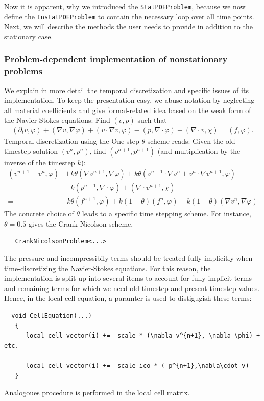 \documentclass[prodmode,acmtoms]{acmsmall}
\numberwithin{equation}{section}
\renewcommand{\phi}{\varphi}
\begin{document}
Now it is apparent, why we introduced the \texttt{StatPDEProblem}, because
we now define the \texttt{InstatPDEProblem} to contain the necessary 
loop over all time points. Next, we will describe the methods the user needs to 
provide in addition to the stationary case.

\subsubsection{Problem-dependent 
implementation of nonstationary problems}
\label{sec:timedep:implementation}
We explain in more detail the temporal discretization
and specific issues of its implementation. 
To keep the presentation easy, we abuse notation 
by neglecting
all material coefficients
and give formal-related idea based on the weak 
form of the Navier-Stokes equations:
Find $(v,p)$ such that
\begin{align*}
(\partial_t v,\phi) 
+ (\nabla v, \nabla \phi)
+ (v\cdot\nabla v,\phi)
-(p,\nabla\cdot \phi)
+(\nabla\cdot v, \chi)
=(f,\phi).
\end{align*}
Temporal discretization using the One-step-$\theta$ scheme reads:
Given the old timestep solution $(v^n,p^n)$, 
find $(v^{n+1}, p^{n+1})$ (and multiplication 
by the inverse of the timestep $k$):
\begin{align*}
(v^{n+1} - v^{n}, \phi)
&+ k\theta (\nabla v^{n+1}, \nabla \phi)
+ k\theta (v^{n+1}\cdot\nabla v^n + 
  v^{n}\cdot\nabla v^{n+1},\phi)\\
&- k (p^{n+1},\nabla\cdot \phi)
+ (\nabla\cdot v^{n+1}, \chi)\\
=&\; k\theta (f^{n+1},\phi) + k(1-\theta) (f^{n},\phi)
- k(1-\theta) (\nabla v^{n}, \nabla \phi) 
\end{align*}
The concrete choice of $\theta$ leads to a
specific time stepping scheme. For instance,
$\theta = 0.5$ gives the Crank-Nicolson scheme,
\begin{lstlisting}
   CrankNicolsonProblem<...>
\end{lstlisting}


The pressure and incompressibily terms should be 
treated fully implicitly when time-discretizing 
the Navier-Stokes equations.
For this reason, the implementation is split up
into several items to account for fully implicit 
terms and remaining terms for which we need 
old timestep and present timestep values. 
Hence, in the local cell equation, a paramter
is used to distigugish these terms:
\begin{lstlisting}
  void CellEquation(...)
   {
      local_cell_vector(i) +=  scale * (\nabla v^{n+1}, \nabla \phi) + etc.

      local_cell_vector(i) +=  scale_ico * (-p^{n+1},\nabla\cdot v)
   }
\end{lstlisting}
Analogoues procedure is performed in the local 
cell matrix.
\end{document}
